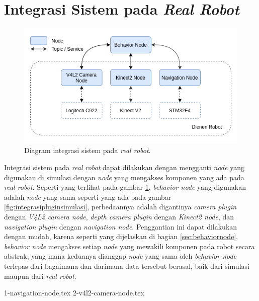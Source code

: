 \section{Integrasi Sistem pada \emph{Real Robot}}
\label{sec:integrasirobot}

\begin{figure}[ht]
  \centering
  \includegraphics[scale=0.55]{gambar/integrasi-real-robot.png}
  \caption{Diagram integrasi sistem pada \emph{real robot}.}
  \label{fig:integrasirealrobot}
\end{figure}

Integrasi sistem pada \emph{real robot} dapat dilakukan dengan mengganti \emph{node} yang digunakan di simulasi dengan \emph{node} yang mengakses komponen yang ada pada \emph{real robot}.
Seperti yang terlihat pada gambar \ref{fig:integrasirealrobot},
  \emph{behavior node} yang digunakan adalah \emph{node} yang sama seperti yang ada pada gambar \ref{fig:integrasipluginsimulasi},
  perbedaannya adalah digantinya \emph{camera plugin} dengan \emph{V4L2 camera node},
  \emph{depth camera plugin} dengan \emph{Kinect2 node},
  dan \emph{navigation plugin} dengan \emph{navigation node}.
Penggantian ini dapat dilakukan dengan mudah,
  karena seperti yang dijelaskan di bagian \ref{sec:behaviornode},
  \emph{behavior node} mengakses setiap \emph{node} yang mewakili komponen pada robot secara abstrak,
  yang mana keduanya dianggap \emph{node} yang sama oleh \emph{behavior node} terlepas dari bagaimana dan darimana data tersebut berasal,
  baik dari simulasi maupun dari \emph{real robot}.

{1-navigation-node.tex}
{2-v4l2-camera-node.tex}
